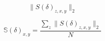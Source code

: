\begin{equation}
	\label{eq:euc_norm}
	\|S(\delta)_{z,x,y}\|_{2}
\end{equation}

\begin{equation}
	\label{eq:z_rot_norm}
	\mathbb{S}(\delta)_{x,y} = \dfrac{\sum_{z} \| S(\delta)_{z,x,y} \|_{2}}{N}
\end{equation}

